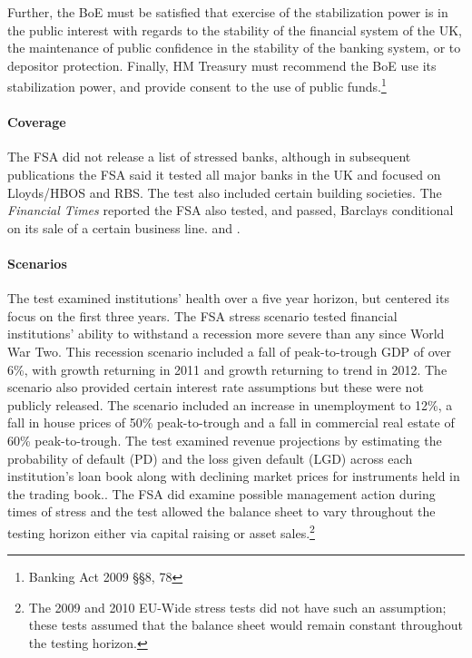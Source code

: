 \documentclass[12pt]{article}
\begin{document}
Further, the BoE must be satisfied that exercise of the stabilization power is in the public interest with regards to the stability of the financial system of the UK, the maintenance of public confidence in the stability of the banking system, or to depositor protection. Finally, HM Treasury must recommend the BoE use its stabilization power, and provide consent to the use of public funds.\footnote{Banking Act 2009 \S \S 8, 78}

\paragraph{Coverage}

The FSA did not release a list of stressed banks, although in subsequent publications the FSA said it tested all major banks in the UK and focused on Lloyds/HBOS and RBS. The test also included certain building societies. The \textit{Financial Times} reported the FSA also tested, and passed, Barclays conditional on its sale of a certain business line. \citep{Results} and \citep{Barclays1}.

\paragraph{Scenarios} The test examined institutions' health over a five year horizon, but centered its focus on the first three years. The FSA stress scenario tested financial institutions' ability to withstand a recession more severe than any since World War Two. This recession scenario included a fall of peak-to-trough GDP of over 6\%, with growth returning in 2011 and growth returning to trend in 2012. The scenario also provided certain interest rate assumptions but these were not publicly released. The scenario included an increase in unemployment to 12\%, a fall in house prices of 50\% peak-to-trough and a fall in commercial real estate of 60\% peak-to-trough. The test examined revenue projections by estimating the probability of default (PD) and the loss given default (LGD) across each institution's loan book along with declining market prices for instruments held in the trading book.\citep{Results}. The FSA did examine possible management action during times of stress and the test allowed the balance sheet to vary throughout the testing horizon either via capital raising or asset sales.\footnote{The 2009 and 2010 EU-Wide stress tests did not have such an assumption; these tests assumed that the balance sheet would remain constant throughout the testing horizon.}
\end{document}
